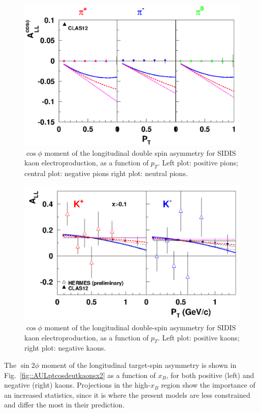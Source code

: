 \begin{figure}
\centering
\includegraphics[width=1.0\textwidth]{sidis/all_pions_x2.pdf}
\caption{\label{fig::ALLptcosdeutpionsx2}$\cos\phi$ moment of the longitudinal double spin asymmetry for SIDIS kaon electroproduction, as a function of $p_T$. Left plot: positive pions; central plot: negative pions right plot: neutral pions.}
\end{figure}
%
\begin{figure}
\centering
\includegraphics[width=1.0\textwidth]{sidis/all_kaons_x2.pdf}
\caption{\label{fig::ALLptcosdeutkaonsx2}$\cos\phi$ moment of the longitudinal double-spin asymmetry for SIDIS kaon electroproduction, as a function of $p_T$. Left plot: positive kaons; right plot: negative kaons.}
\end{figure}
%
%
The $\sin2\phi$ moment of the longitudinal target-spin asymmetry is shown in Fig.~\ref{fig::AULptcosdeutkaonsx2} as a function of $x_B$, for both positive (left) and negative (right) kaons. Projections in the high-$x_B$ region show the importance of an increased statistics, since it is where the present models are less constrained and differ the most in their prediction. 
